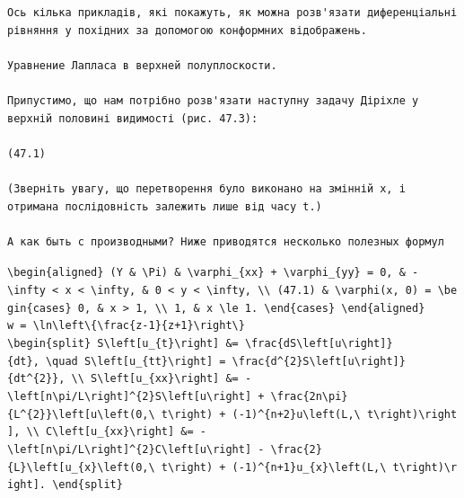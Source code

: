 \documentclass[
  ukrainian,
]{article}
\begin{document}
\begin{verbatim}
Ось кілька прикладів, які покажуть, як можна розв'язати диференціальні рівняння у похідних за допомогою конформних відображень.

Уравнение Лапласа в верхней полуплоскости.

Припустимо, що нам потрібно розв'язати наступну задачу Діріхле у верхній половині видимості (рис. 47.3):

(47.1)

(Зверніть увагу, що перетворення було виконано на змінній x, і отримана послідовність залежить лише від часу t.)

А как быть с производными? Ниже приводятся несколько полезных формул
\end{verbatim}

\texttt{\textbackslash{}begin\{aligned\}\ (Y\ \&\ \textbackslash{}Pi)\ \&\ \textbackslash{}varphi\_\{xx\}\ +\ \textbackslash{}varphi\_\{yy\}\ =\ 0,\ \&\ -\textbackslash{}infty\ \textless{}\ x\ \textless{}\ \textbackslash{}infty,\ \&\ 0\ \textless{}\ y\ \textless{}\ \textbackslash{}infty,\ \textbackslash{}\textbackslash{}\ (47.1)\ \&\ \textbackslash{}varphi(x,\ 0)\ =\ \textbackslash{}begin\{cases\}\ 0,\ \&\ \textbar{}x\textbar{}\ \textgreater{}\ 1,\ \textbackslash{}\textbackslash{}\ 1,\ \&\ \textbar{}x\textbar{}\ \textbackslash{}le\ 1.\ \textbackslash{}end\{cases\}\ \textbackslash{}end\{aligned\}}
\texttt{w\ =\ \textbackslash{}ln\textbackslash{}left\textbackslash{}\{\textbackslash{}frac\{z-1\}\{z+1\}\textbackslash{}right\textbackslash{}\}}
\texttt{\textbackslash{}begin\{split\}\ S\textbackslash{}left{[}u\_\{t\}\textbackslash{}right{]}\ \&=\ \textbackslash{}frac\{dS\textbackslash{}left{[}u\textbackslash{}right{]}\}\{dt\},\ \textbackslash{}quad\ S\textbackslash{}left{[}u\_\{tt\}\textbackslash{}right{]}\ =\ \textbackslash{}frac\{d\^{}\{2\}S\textbackslash{}left{[}u\textbackslash{}right{]}\}\{dt\^{}\{2\}\},\ \textbackslash{}\textbackslash{}\ S\textbackslash{}left{[}u\_\{xx\}\textbackslash{}right{]}\ \&=\ -\textbackslash{}left{[}n\textbackslash{}pi/L\textbackslash{}right{]}\^{}\{2\}S\textbackslash{}left{[}u\textbackslash{}right{]}\ +\ \textbackslash{}frac\{2n\textbackslash{}pi\}\{L\^{}\{2\}\}\textbackslash{}left{[}u\textbackslash{}left(0,\textbackslash{}\ t\textbackslash{}right)\ +\ (-1)\^{}\{n+2\}u\textbackslash{}left(L,\textbackslash{}\ t\textbackslash{}right)\textbackslash{}right{]},\ \textbackslash{}\textbackslash{}\ C\textbackslash{}left{[}u\_\{xx\}\textbackslash{}right{]}\ \&=\ -\textbackslash{}left{[}n\textbackslash{}pi/L\textbackslash{}right{]}\^{}\{2\}C\textbackslash{}left{[}u\textbackslash{}right{]}\ -\ \textbackslash{}frac\{2\}\{L\}\textbackslash{}left{[}u\_\{x\}\textbackslash{}left(0,\textbackslash{}\ t\textbackslash{}right)\ +\ (-1)\^{}\{n+1\}u\_\{x\}\textbackslash{}left(L,\textbackslash{}\ t\textbackslash{}right)\textbackslash{}right{]}.\ \textbackslash{}end\{split\}}
\end{document}
